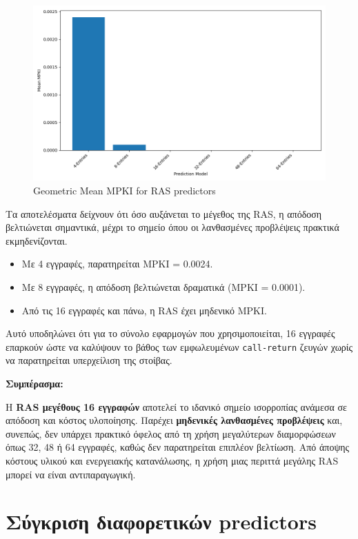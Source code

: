 \documentclass{article}
\begin{document}
\begin{figure}[H]
    \centering
    \includegraphics[width=1\textwidth]{figures/5_5/geom_mean.png}
    \caption{Geometric Mean MPKI for RAS predictors}
    \label{fig:mean_mpkis_RASs}
\end{figure}

Τα αποτελέσματα δείχνουν ότι όσο αυξάνεται το μέγεθος της RAS, η απόδοση βελτιώνεται σημαντικά, μέχρι το σημείο όπου οι λανθασμένες προβλέψεις πρακτικά εκμηδενίζονται.

\begin{itemize} \item Με 4 εγγραφές, παρατηρείται MPKI = 0.0024. \item Με 8 εγγραφές, η απόδοση βελτιώνεται δραματικά (MPKI = 0.0001). \item Από τις 16 εγγραφές και πάνω, η RAS έχει μηδενικό MPKI. \end{itemize}

Αυτό υποδηλώνει ότι για το σύνολο εφαρμογών που χρησιμοποιείται, 16 εγγραφές επαρκούν ώστε να καλύψουν το βάθος των εμφωλευμένων \texttt{call-return} ζευγών χωρίς να παρατηρείται υπερχείλιση της στοίβας.

\vspace{0.3cm} \textbf{Συμπέρασμα:}

Η \textbf{RAS μεγέθους 16 εγγραφών} αποτελεί το ιδανικό σημείο ισορροπίας ανάμεσα σε απόδοση και κόστος υλοποίησης. Παρέχει \textbf{μηδενικές λανθασμένες προβλέψεις} και, συνεπώς, δεν υπάρχει πρακτικό όφελος από τη χρήση μεγαλύτερων διαμορφώσεων όπως 32, 48 ή 64 εγγραφές, καθώς δεν παρατηρείται επιπλέον βελτίωση. Από άποψης κόστους υλικού και ενεργειακής κατανάλωσης, η χρήση μιας περιττά μεγάλης RAS μπορεί να είναι αντιπαραγωγική.

\section{Σύγκριση διαφορετικών predictors}
\end{document}
